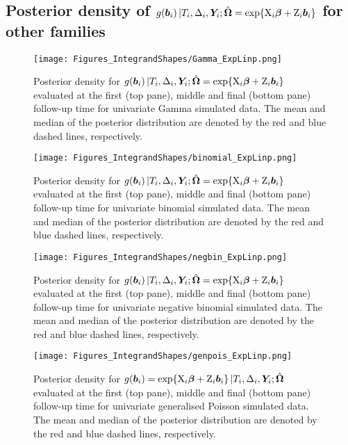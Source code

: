 \subsection{Posterior density of \texorpdfstring{$g\!\left(\bm{b}_i\right)|T_i,\Delta_i,\bm{Y}_i;\hat{\bm{\Omega}}=\exp\!\left\{\mathrm{X}_i\bm{\beta}+\mathrm{Z}_i\bm{b}_i\right\}$}{expeta} for other families}\label{sec:appendix-suppfigs-justification-Expetas}
\begin{figure}[ht]
    \centering
    \texttt{[image: Figures\_IntegrandShapes/Gamma\_ExpLinp.png]}
    \caption{Posterior density for $g\!\left(\bm{b}_i\right)|T_i,\Delta_i,\bm{Y}_i;\hat{\bm{\Omega}}=\exp\!\left\{\mathrm{X}_i\bm{\beta}+\mathrm{Z}_i\bm{b}_i\right\}$ evaluated at the first (top pane), middle and final (bottom pane) follow-up time for univariate Gamma simulated data. The mean and median of the posterior distribution are denoted by the red and blue dashed lines, respectively.}
    \label{fig:justification-integrands-Gamma-Expeta}
\end{figure}
\clearpage
\begin{figure}[ht]
    \centering
    \texttt{[image: Figures\_IntegrandShapes/binomial\_ExpLinp.png]}
    \caption{Posterior density for $g\!\left(\bm{b}_i\right)|T_i,\Delta_i,\bm{Y}_i;\hat{\bm{\Omega}}=\exp\!\left\{\mathrm{X}_i\bm{\beta}+\mathrm{Z}_i\bm{b}_i\right\}$ evaluated at the first (top pane), middle and final (bottom pane) follow-up time for univariate binomial simulated data. The mean and median of the posterior distribution are denoted by the red and blue dashed lines, respectively.}
    \label{fig:justification-integrands-binomial-Expeta}
\end{figure}
\clearpage
\begin{figure}[ht]
    \centering
    \texttt{[image: Figures\_IntegrandShapes/negbin\_ExpLinp.png]}
    \caption{Posterior density for $g\!\left(\bm{b}_i\right)|T_i,\Delta_i,\bm{Y}_i;\hat{\bm{\Omega}}=\exp\!\left\{\mathrm{X}_i\bm{\beta}+\mathrm{Z}_i\bm{b}_i\right\}$ evaluated at the first (top pane), middle and final (bottom pane) follow-up time for univariate negative binomial simulated data. The mean and median of the posterior distribution are denoted by the red and blue dashed lines, respectively.}
    \label{fig:justification-integrands-negbin-Expeta}
\end{figure}
\clearpage
\begin{figure}[ht]
    \centering
    \texttt{[image: Figures\_IntegrandShapes/genpois\_ExpLinp.png]}
    \caption{Posterior density for $g\!\left(\bm{b}_i\right)=\exp\!\left\{\mathrm{X}_i\bm{\beta}+\mathrm{Z}_i\bm{b}_i\right\}|T_i,\Delta_i,\bm{Y}_i;\hat{\bm{\Omega}}$ evaluated at the first (top pane), middle and final (bottom pane) follow-up time for univariate generalised Poisson simulated data. The mean and median of the posterior distribution are denoted by the red and blue dashed lines, respectively.}
    \label{fig:justification-integrands-genpois-Expeta}
\end{figure}
\clearpage
